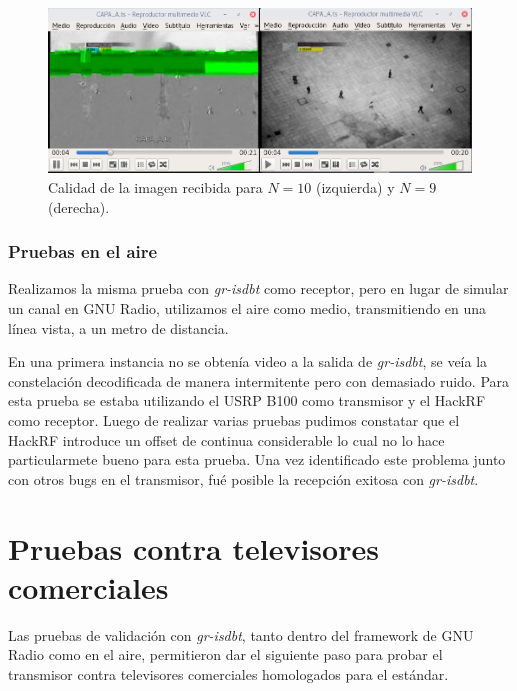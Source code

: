 \begin{figure}[!h]
	\centering
	\includegraphics[scale=0.4]{figuras/cap06/calidad_imagen}
	\caption{\label{f:calidad_imagen} Calidad de la imagen recibida para $N=10$ (izquierda) y $N=9$ (derecha).}
\end{figure}

\subsubsection{Pruebas en el aire}

Realizamos la misma prueba con \textit{gr-isdbt} como receptor, pero en lugar de simular un canal en GNU Radio, utilizamos el aire como medio, transmitiendo en una línea vista, a un metro de distancia.

En una primera instancia no se obtenía video a la salida de \textit{gr-isdbt}, se veía la constelación decodificada de manera intermitente pero con demasiado ruido. Para esta prueba se estaba utilizando el USRP B100 como transmisor y el HackRF como receptor. Luego de realizar varias pruebas pudimos constatar que el HackRF introduce un offset de continua considerable lo cual no lo hace particularmete bueno para esta prueba. Una vez identificado este problema junto con otros bugs en el transmisor, fué posible la recepción exitosa con \textit{gr-isdbt}. 

\section{Pruebas contra televisores comerciales}

Las pruebas de validación con \textit{gr-isdbt}, tanto dentro del framework de GNU Radio como en el aire, permitieron dar el siguiente paso para probar el transmisor contra televisores comerciales homologados para el estándar.  

